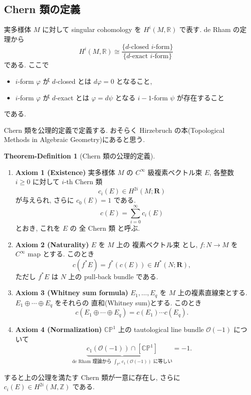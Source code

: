 \documentclass[dvipdfmx,a4paper,11pt]{article} %
\theoremstyle{definition}
\newtheorem{thmdefn}[thm]{Theorem-Definition}
\theoremstyle{remark}
\numberwithin{equation}{section}
\newcommand{\R}{\mathbb{R}}
\newcommand{\Z}{\mathbb{Z}}
\newcommand{\C}{\mathbb{C}}
\begin{document}
\subsection{Chern 類の定義}
実多様体 \(M\) に対して singular cohomology を \(H^{i}(M, \R)\) で表す. de Rham の定理から
\[
H^{i}(M, \R) \cong \frac{ \{ \text{\(d\)-closed \(i\)-form}\}}{\{ \text{\(d\)-exact \(i\)-form}\}}
\]
である. ここで
\begin{itemize}
\item \(i\)-form \(\varphi\) が \(d\)-closed とは \(d \varphi=0\) となること,
\item \(i\)-form \(\varphi\) が \(d\)-exact とは \(\varphi=d \psi\) となる \(i-1\)-form \(\psi\) が存在すること
\end{itemize}
である.

Chern 類を公理的定義で定義する. おそらく Hirzebruch の本(Topological Methods in Algebraic Geometry)にあると思う.
\begin{thmdefn}[Chern 類の公理的定義]
\label{thmdefn-axiom-chern}
\text{}

\begin{enumerate}
\item\textbf{Axiom 1 (Existence)}
実多様体 \(M\) の \(C^\infty\) 級複素ベクトル束 \(E\), 各整数 \(i\geq 0\) に対して \(i\)-th Chern 類
\[
c_i(E)\in H^{2i}(M;\mathbf{R})
\]
が与えられ, さらに \(c_0(E)=1\) である.
\[
c(E)=\sum_{i=0}^{\infty} c_i(E)
\]
とおき, これを \(E\) の 全 Chern 類 と呼ぶ.
\item 
\textbf{Axiom 2 (Naturality)}
\(E\) を \(M\) 上の 複素ベクトル束 とし, \(f:N\to M\) を \(C^\infty\) map とする. このとき
\[
c(f^*E)=f^*(c(E))\in H^*(N;\mathbf{R}),
\]
ただし \(f^*E\) は \(N\) 上の pull-back bundle である.
\item \textbf{Axiom 3 (Whitney sum formula)}
\(E_1,\ldots,E_q\) を \(M\) 上の複素直線束とする. \(E_1\oplus\cdots\oplus E_q\) をそれらの 直和(Whitney sum)とする. このとき
\[
c(E_1\oplus\cdots\oplus E_q)=c(E_1)\cdots c(E_q).
\]
\item \textbf{Axiom 4 (Normalization)}
\(\C\mathbb{P}^1\) 上の tautological line bundle \(\mathcal{O}(-1)\) について
\[
\underbrace{c_1(\mathcal{O}(-1)) \cap [\C\mathbb{P}^1]
}_{\text{de Rham 理論から \(\int_{\mathbb{P}^{1}}c_1(\mathcal{O}(-1))\) に等しい}} 
=-1.
\]
\end{enumerate}

すると上の公理を満たす Chern 類が一意に存在し, さらに \(c_i(E) \in H^{2i}(M, \Z)\) である.
\end{thmdefn}
\end{document}
